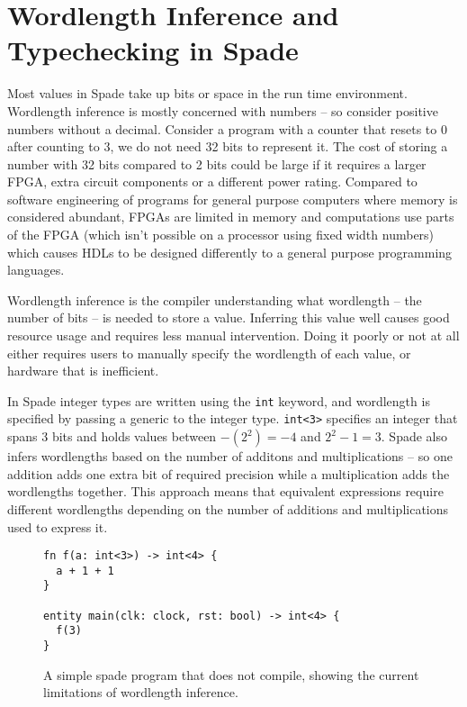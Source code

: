 \section{Wordlength Inference and Typechecking in Spade}
\label{sec:TheProblem}
Most values in Spade take up bits or space in the run time environment. Wordlength inference is mostly concerned with numbers -- so consider positive numbers without a decimal. Consider a program with a counter that resets to 0 after counting to 3, we do not need 32 bits to represent it. The cost of storing a number with 32 bits compared to 2 bits could be large if it requires a larger FPGA, extra circuit components or a different power rating. Compared to software engineering of programs for general purpose computers where memory is considered abundant, FPGAs are limited in memory and computations use parts of the FPGA (which isn't possible on a processor using fixed width numbers) which causes HDLs to be designed differently to a general purpose programming languages.

Wordlength inference is the compiler understanding what wordlength -- the number of bits -- is needed to store a value. Inferring this value well causes good resource usage and requires less manual intervention. Doing it poorly or not at all either requires users to manually specify the wordlength of each value, or hardware that is inefficient.

In Spade integer types are written using the \verb|int| keyword, and wordlength is specified by passing a generic to the integer type. \verb|int<3>| specifies an integer that spans 3 bits and holds values between $-(2^2) = -4$ and $2^2 - 1 = 3$. Spade also infers wordlengths based on the number of additons and multiplications -- so one addition adds one extra bit of required precision while a multiplication adds the wordlengths together. This approach means that equivalent expressions require different wordlengths depending on the number of additions and multiplications used to express it. 

\begin{figure}
\centering
\begin{verbatim}
fn f(a: int<3>) -> int<4> {
  a + 1 + 1
}

entity main(clk: clock, rst: bool) -> int<4> {
  f(3)
}
\end{verbatim}
\caption{A simple spade program that does not compile, showing the current limitations of wordlength inference.}
\label{figSimpleFaultSpade}
\end{figure}

